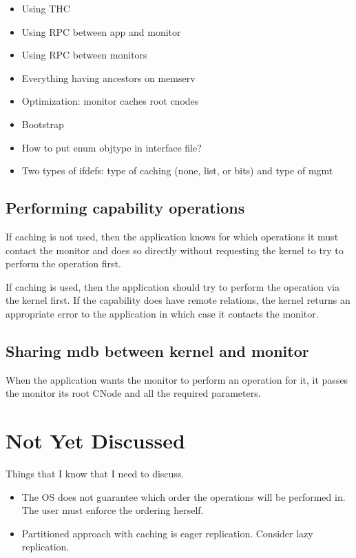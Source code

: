 \documentclass[a4paper,twoside]{report} %
\begin{document}
\begin{itemize}
\item Using THC
\item Using RPC between app and monitor
\item Using RPC between monitors
\item Everything having ancestors on memserv
\item Optimization: monitor caches root cnodes
\item Bootstrap
\item How to put enum objtype in interface file?
\item Two types of ifdefs: type of caching (none, list, or bits) and
  type of mgmt
\end{itemize}

\section{Performing capability operations}
If caching is not used, then the application knows for which
operations it must contact the monitor and does so directly without
requesting the kernel to try to perform the operation first.

If caching is used, then the application should try to perform the
operation via the kernel first. If the capability does have remote
relations, the kernel returns an appropriate error to the application
in which case it contacts the monitor.

\section{Sharing mdb between kernel and monitor}
When the application wants the monitor to perform an operation for it,
it passes the monitor its root CNode and all the required parameters.


\chapter{Not Yet Discussed}\label{chap:nyd}

Things that I know that I need to discuss.

\begin{itemize}

\item The OS does not guarantee which order the operations will be
  performed in. The user must enforce the ordering herself.

\item Partitioned approach with caching is eager replication. Consider
  lazy replication.
\end{itemize}



\end{document}

